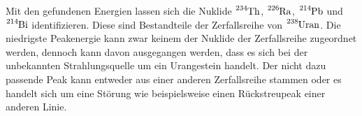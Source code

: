 Mit den gefundenen Energien lassen sich die Nuklide $\ce{^{234}Th}$, $\ce{^{226}Ra}$, $\ce{^{214}Pb}$ und
$\ce{^{214}Bi}$ identifizieren. Diese sind Bestandteile der Zerfallsreihe von $\ce{^{238}Uran}$.
Die niedrigste Peakenergie kann zwar keinem der Nuklide der Zerfallsreihe zugeordnet werden, dennoch kann davon ausgegangen
werden, dass es sich bei der unbekannten Strahlungsquelle um ein Urangestein handelt.
Der nicht dazu passende Peak kann entweder aus einer anderen Zerfallsreihe stammen oder es handelt sich um eine Störung
wie beispielsweise einen Rückstreupeak einer anderen Linie.


%


